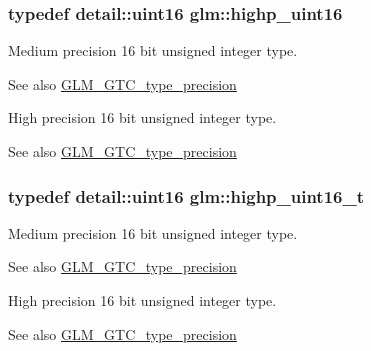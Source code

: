 \subsubsection[{\texorpdfstring{highp\+\_\+uint16}{highp_uint16}}]{\setlength{\rightskip}{0pt plus 5cm}typedef detail\+::uint16 {\bf glm\+::highp\+\_\+uint16}}\hypertarget{group__gtc__type__precision_ga4d32967d45ba8365e2a05eaaac85e978}{}\label{group__gtc__type__precision_ga4d32967d45ba8365e2a05eaaac85e978}
Medium precision 16 bit unsigned integer type. \begin{DoxySeeAlso}{See also}
\hyperlink{group__gtc__type__precision}{G\+L\+M\+\_\+\+G\+T\+C\+\_\+type\+\_\+precision}
\end{DoxySeeAlso}
High precision 16 bit unsigned integer type. \begin{DoxySeeAlso}{See also}
\hyperlink{group__gtc__type__precision}{G\+L\+M\+\_\+\+G\+T\+C\+\_\+type\+\_\+precision} 
\end{DoxySeeAlso}
\subsubsection[{\texorpdfstring{highp\+\_\+uint16\+\_\+t}{highp_uint16_t}}]{\setlength{\rightskip}{0pt plus 5cm}typedef detail\+::uint16 {\bf glm\+::highp\+\_\+uint16\+\_\+t}}\hypertarget{group__gtc__type__precision_ga3145bc0ee80432c165e985a188a722b3}{}\label{group__gtc__type__precision_ga3145bc0ee80432c165e985a188a722b3}
Medium precision 16 bit unsigned integer type. \begin{DoxySeeAlso}{See also}
\hyperlink{group__gtc__type__precision}{G\+L\+M\+\_\+\+G\+T\+C\+\_\+type\+\_\+precision}
\end{DoxySeeAlso}
High precision 16 bit unsigned integer type. \begin{DoxySeeAlso}{See also}
\hyperlink{group__gtc__type__precision}{G\+L\+M\+\_\+\+G\+T\+C\+\_\+type\+\_\+precision} 
\end{DoxySeeAlso}
